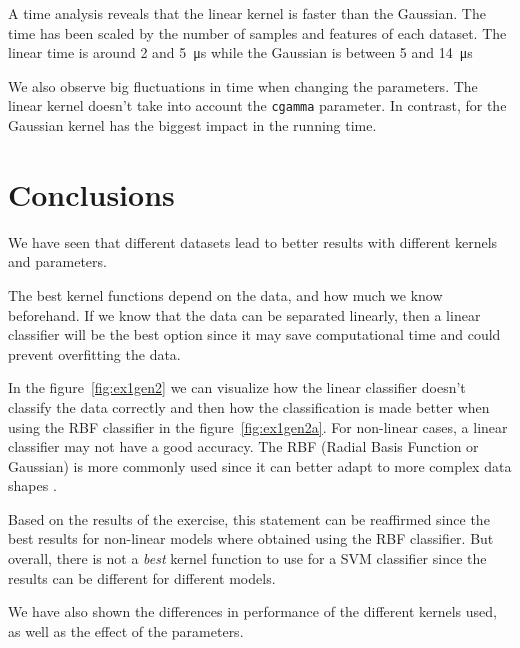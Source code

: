 \documentclass[a4paper]{article}
\begin{document}
A time analysis reveals that the linear kernel is faster than the Gaussian. The 
time has been scaled by the number of samples and features of each dataset. The 
linear time is around 2 and \SI{5}{\micro\second} while the Gaussian is between 
5 and \SI{14}{\micro\second}

We also observe big fluctuations in time when changing the parameters. The 
linear kernel doesn't take into account the \texttt{cgamma} parameter. In 
contrast, for the Gaussian kernel has the biggest impact in the running time.

%
%
%
\section{Conclusions}

We have seen that different datasets lead to better results with different 
kernels and parameters.

The best kernel functions depend on the data, and how much we know beforehand.  
If we know that the data can be separated linearly, then a linear classifier 
will be the best option since it may save computational time and could prevent 
overfitting the data.

In the figure~\ref{fig:ex1gen2} we can visualize how the linear classifier 
doesn't classify the data correctly and then how the classification is made 
better when using the RBF classifier in the figure~\ref{fig:ex1gen2a}. For 
non-linear cases, a linear classifier may not have a good accuracy. The RBF 
(Radial Basis Function or Gaussian) is more commonly used since it can better 
adapt to more complex data shapes \cite{sci.net, select-svm}.

Based on the results of the exercise, this statement can be reaffirmed since the 
best results for non-linear models where obtained using the RBF classifier. But 
overall, there is not a \textsl{best} kernel function to use for a SVM 
classifier since the results can be different for different models.


We have also shown the differences in performance of the different kernels used, 
as well as the effect of the parameters.
\end{document}
